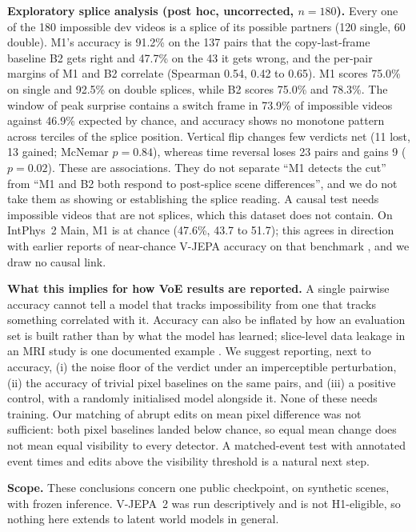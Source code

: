 \textbf{Exploratory splice analysis (post hoc, uncorrected, $n=180$).} Every one of the 180 impossible dev videos is a splice of its possible partners (120 single, 60 double). M1's accuracy is 91.2\% on the 137 pairs that the copy-last-frame baseline B2 gets right and 47.7\% on the 43 it gets wrong, and the per-pair margins of M1 and B2 correlate (Spearman 0.54, 0.42 to 0.65). M1 scores 75.0\% on single and 92.5\% on double splices, while B2 scores 75.0\% and 78.3\%. The window of peak surprise contains a switch frame in 73.9\% of impossible videos against 46.9\% expected by chance, and accuracy shows no monotone pattern across terciles of the splice position. Vertical flip changes few verdicts net (11 lost, 13 gained; McNemar $p=0.84$), whereas time reversal loses 23 pairs and gains 9 ($p=0.02$). These are associations. They do not separate ``M1 detects the cut'' from ``M1 and B2 both respond to post-splice scene differences'', and we do not take them as showing or establishing the splice reading. A causal test needs impossible videos that are not splices, which this dataset does not contain. On IntPhys~2 Main, M1 is at chance (47.6\%, 43.7 to 51.7); this agrees in direction with earlier reports of near-chance V-JEPA accuracy on that benchmark \cite{bordes2025,su2025}, and we draw no causal link.

\textbf{What this implies for how VoE results are reported.} A single pairwise accuracy cannot tell a model that tracks impossibility from one that tracks something correlated with it. Accuracy can also be inflated by how an evaluation set is built rather than by what the model has learned; slice-level data leakage in an MRI study is one documented example \cite{veetil2024}. We suggest reporting, next to accuracy, (i) the noise floor of the verdict under an imperceptible perturbation, (ii) the accuracy of trivial pixel baselines on the same pairs, and (iii) a positive control, with a randomly initialised model alongside it. None of these needs training. Our matching of abrupt edits on mean pixel difference was not sufficient: both pixel baselines landed below chance, so equal mean change does not mean equal visibility to every detector. A matched-event test with annotated event times and edits above the visibility threshold is a natural next step.

\textbf{Scope.} These conclusions concern one public checkpoint, on synthetic scenes, with frozen inference. V-JEPA~2 was run descriptively and is not H1-eligible, so nothing here extends to latent world models in general.

